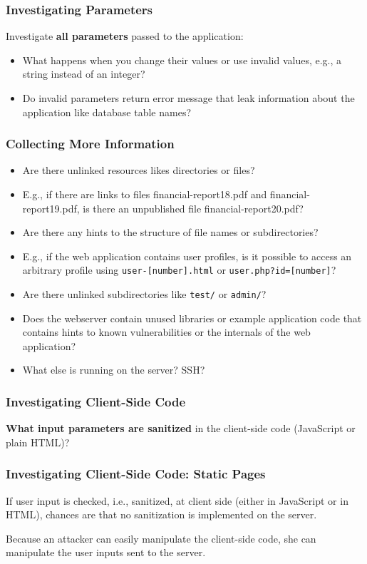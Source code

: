 \documentclass[aspectratio=169]{beamer}
\begin{document}
\begin{frame}
    \frametitle{Investigating Parameters}
    Investigate \textbf{all parameters} passed to the application:
    \begin{itemize}
        \item What happens when you change their values or use invalid values, e.g., a string instead of an integer?
        \item Do invalid parameters return error message that leak information about the application like database table names?
    \end{itemize}
\end{frame}

\begin{frame}
    \frametitle{Collecting More Information}
   \begin{itemize}
       \item Are there unlinked resources likes directories or files?
       \item E.g., if there are links to files financial-report18.pdf and financial-report19.pdf, is there an unpublished file financial-report20.pdf?
       \item Are there any hints to the structure of file names or subdirectories?
       \item E.g., if the web application contains user profiles, is it possible to access an arbitrary profile using \texttt{user-[number].html} or \texttt{user.php?id=[number]}?
       \item Are there unlinked subdirectories like \texttt{test/} or \texttt{admin/}?
       \item Does the webserver contain unused libraries or example application code that contains hints to known vulnerabilities or the internals of the web application? 
       \item What else is running on the server? SSH?
   \end{itemize}
\end{frame}

\begin{frame}
    \frametitle{Investigating Client-Side Code}
    \textbf{What input parameters are sanitized} in the client-side code (JavaScript or plain HTML)?
\end{frame}

\begin{frame}
    \frametitle{Investigating Client-Side Code: Static Pages}
    If user input is checked, i.e., sanitized, at client side (either in JavaScript or in HTML), chances are that no sanitization is implemented on the server. 
    
    Because an attacker can easily manipulate the client-side code, she can manipulate the user inputs sent to the server.
\end{frame}
\end{document}
